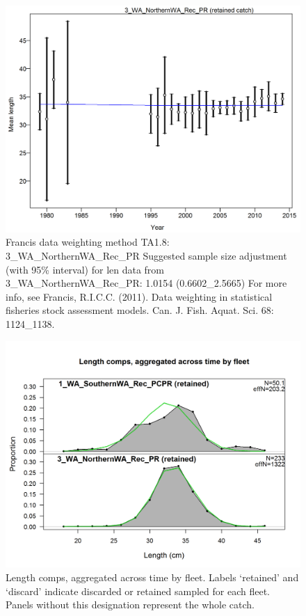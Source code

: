 \documentclass[12pt,]{article}
\begin{document}
\begin{figure}[htbp]
\centering
\includegraphics{./r4ss/plots_mod1/comp_lenfit_data_weighting_TA1.8_3_WA_NorthernWA_Rec_PR.png}
\caption{Francis data weighting method TA1.8: 3\_WA\_NorthernWA\_Rec\_PR
Suggested sample size adjustment (with 95\% interval) for len data from
3\_WA\_NorthernWA\_Rec\_PR: 1.0154 (0.6602\_2.5665) For more info, see
Francis, R.I.C.C. (2011). Data weighting in statistical fisheries stock
assessment models. Can. J. Fish. Aquat. Sci. 68: 1124\_1138.
\label{fig:mod1_8_comp_lenfit_data_weighting_TA1.8_3_WA_NorthernWA_Rec_PR}}
\end{figure}

\begin{figure}[htbp]
\centering
\includegraphics{./r4ss/plots_mod1/comp_lenfit__aggregated_across_time.png}
\caption{Length comps, aggregated across time by fleet. Labels
`retained' and `discard' indicate discarded or retained sampled for each
fleet. Panels without this designation represent the whole catch.
\label{fig:mod1_9_comp_lenfit__aggregated_across_time}}
\end{figure}
\end{document}
